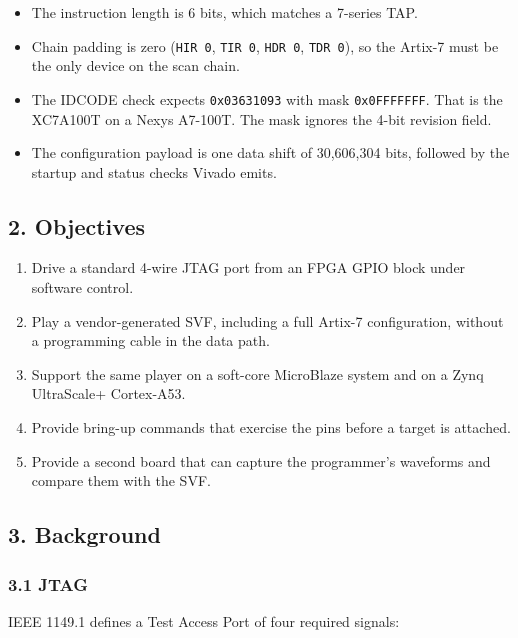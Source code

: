 \documentclass[
  11pt,
  a4paper,
]{article}
\providecommand{\tightlist}{%
  \setlength{\itemsep}{0pt}\setlength{\parskip}{0pt}}
\begin{document}
\begin{itemize}
\tightlist
\item
  The instruction length is 6 bits, which matches a 7-series TAP.
\item
  Chain padding is zero (\texttt{HIR\ 0}, \texttt{TIR\ 0},
  \texttt{HDR\ 0}, \texttt{TDR\ 0}), so the Artix-7 must be the only
  device on the scan chain.
\item
  The IDCODE check expects \texttt{0x03631093} with mask
  \texttt{0x0FFFFFFF}. That is the XC7A100T on a Nexys A7-100T. The mask
  ignores the 4-bit revision field.
\item
  The configuration payload is one data shift of 30,606,304 bits,
  followed by the startup and status checks Vivado emits.
\end{itemize}

\subsection{2. Objectives}\label{objectives}

\begin{enumerate}
\def\labelenumi{\arabic{enumi}.}
\tightlist
\item
  Drive a standard 4-wire JTAG port from an FPGA GPIO block under
  software control.
\item
  Play a vendor-generated SVF, including a full Artix-7 configuration,
  without a programming cable in the data path.
\item
  Support the same player on a soft-core MicroBlaze system and on a Zynq
  UltraScale+ Cortex-A53.
\item
  Provide bring-up commands that exercise the pins before a target is
  attached.
\item
  Provide a second board that can capture the programmer's waveforms and
  compare them with the SVF.
\end{enumerate}

\subsection{3. Background}\label{background}

\subsubsection{3.1 JTAG}\label{jtag}

IEEE 1149.1 defines a Test Access Port of four required signals:
\end{document}
